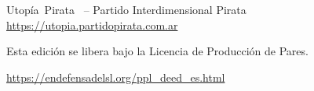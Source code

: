     \newpage
    \thispagestyle{empty}

    \begin{flushleft}\hbox{\Large{Utopía Pirata}}
    \copyleft \, \the\year\space -- Partido Interdimensional Pirata
    \url{https://utopia.partidopirata.com.ar}

    \vfill

    \centering

    Esta edición se libera bajo la Licencia de Producción de Pares.

    \footnotesize{\url{https://endefensadelsl.org/ppl_deed_es.html}}

    \end{flushleft}
   \newpage

